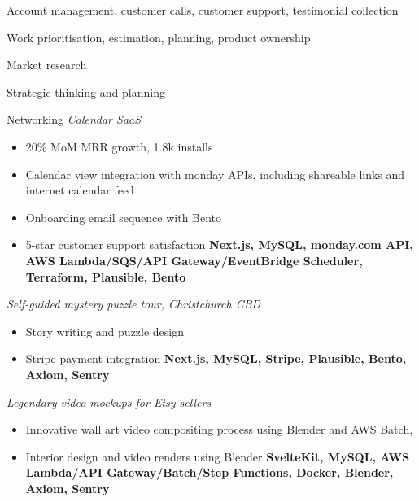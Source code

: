 \documentclass[a4paper,10pt]{article}
\begin{document}
            \begin{resume_list}
              \item Account management, customer calls, customer support, testimonial collection
              \item Work prioritisation, estimation, planning, product ownership
              \item Market research
              \item Strategic thinking and planning
              \item Networking
              \vspace{5pt}
               \textit{Calendar SaaS}
              \begin{itemize}[itemsep=-2px, parsep=1pt, leftmargin=10pt]
                \item 20\% MoM MRR growth, 1.8k installs
                \item Calendar view integration with monday APIs, including shareable links and internet calendar feed
                \item Onboarding email sequence with Bento
                \item 5-star customer support satisfaction
                \newline \textbf{Next.js, MySQL, monday.com API, AWS Lambda/SQS/API Gateway/EventBridge Scheduler, Terraform, Plausible, Bento}
              \end{itemize}
              \vspace{5pt}
               \textit{Self-guided mystery puzzle tour, Christchurch CBD}
              \begin{itemize}[itemsep=-2px, parsep=1pt, leftmargin=10pt]
                \item Story writing and puzzle design
                \item Stripe payment integration
                \newline \textbf{Next.js, MySQL, Stripe, Plausible, Bento, Axiom, Sentry}
              \end{itemize}
              \vspace{5pt}
               \textit{Legendary video mockups for Etsy sellers}
              \begin{itemize}[itemsep=-2px, parsep=1pt, leftmargin=10pt]
                \item Innovative wall art video compositing process using Blender and AWS Batch,
                \item Interior design and video renders using Blender
                \newline \textbf{SvelteKit, MySQL, AWS Lambda/API Gateway/Batch/Step Functions, Docker, Blender, Axiom, Sentry}
              \end{itemize}
            \end{resume_list}
\end{document}
